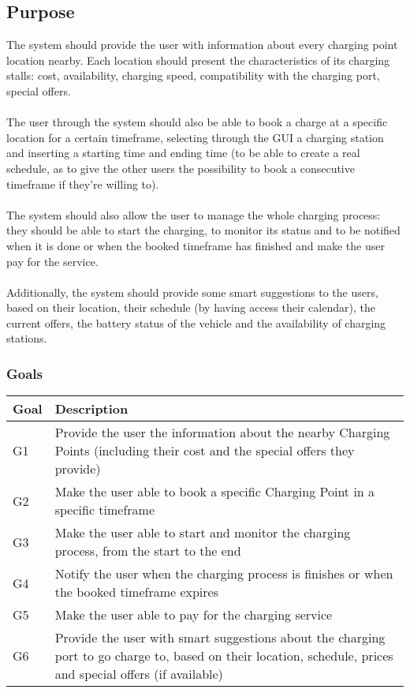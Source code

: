 \subsection{Purpose}
The system should provide the user with information about every charging point location nearby. Each location should present the characteristics of its charging stalls: cost, availability, charging speed, compatibility with the charging port, special offers.
\\\\
The user through the system should also be able to book a charge at a specific location for a certain timeframe, selecting through the GUI a charging station and inserting a starting time and ending time (to be able to create a real schedule, as to give the other users the possibility to book a consecutive timeframe if they’re willing to).
\\\\
The system should also allow the user to manage the whole charging process: they should be able to start the charging, to monitor its status and to be notified when it is done or when the booked timeframe has finished and make the user pay for the service.
\\\\
Additionally, the system should provide some smart suggestions to the users, based on their location, their schedule (by having access their calendar), the current offers, the battery status of the vehicle and the availability of charging stations.

\subsubsection{Goals}
\begin{table}[h!]
    \centering
    \begin{tabular}{|m{0.9cm}|m{10.5cm}|}
    \hline
      \bfseries Goal & \bfseries Description\\
      \hline
      \centering G1 & Provide the user the information about the nearby Charging Points (including their cost and the special offers they provide)\\ 
      \hline
      \centering G2 & Make the user able to book a specific Charging Point in a specific timeframe\\
      \hline
      \centering G3 & Make the user able to start and monitor the charging process, from the start to the end\\
      \hline
      \centering G4 & Notify the user when the charging process is finishes or when the booked timeframe expires\\
      \hline
      \centering G5 & Make the user able to pay for the charging service\\
      \hline
      \centering G6 & Provide the user with smart suggestions about the charging port to go charge to, based on their location, schedule, prices and special offers (if available)\\
      \hline
    \end{tabular}
\end{table}

